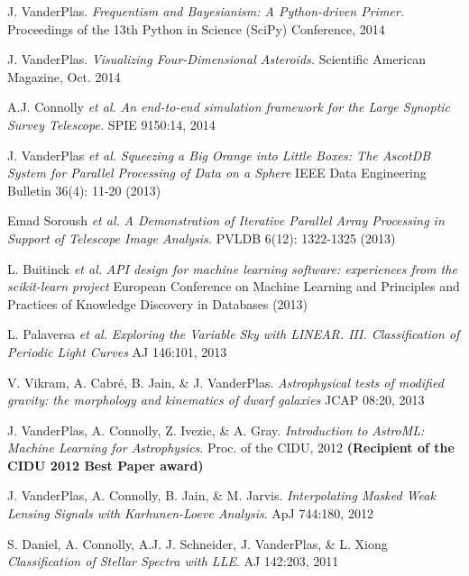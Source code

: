 \documentclass{article} %
\def\bf{\bfseries}
\def\sl{\slshape}
\begin{document}
{\begin{itemize}[leftmargin=0ex, itemsep=0ex, parsep=.5ex, labelindent=-4ex]
    \publication
      J. VanderPlas.
      {\it Frequentism and Bayesianism: A Python-driven Primer.}
      Proceedings of the 13th Python in Science (SciPy) Conference, 2014

    \publication
      J. VanderPlas.
      {\it Visualizing Four-Dimensional Asteroids.}
      Scientific American Magazine, Oct. 2014

    \publication
      A.J. Connolly {\it et al.}
      {\it An end-to-end simulation framework for the Large Synoptic Survey Telescope.}
      SPIE 9150:14, 2014

    \publication
      J. VanderPlas {\it et al.}
      {\it Squeezing a Big Orange into Little Boxes: The AscotDB System
        for Parallel Processing of Data on a Sphere}
      IEEE Data Engineering Bulletin 36(4): 11-20 (2013)

    \publication
      Emad Soroush {\it et al.}
      {\it A Demonstration of Iterative Parallel Array Processing in Support
        of Telescope Image Analysis.}
      PVLDB 6(12): 1322-1325 (2013)

    \publication
      L. Buitinck {\it et al.}
      {\it API design for machine learning software:
        experiences from the scikit-learn project}
      European Conference on Machine Learning and Principles and Practices
      of Knowledge Discovery in Databases (2013)

    \publication
      L. Palaversa {\sl et al.}
      {\sl Exploring the Variable Sky with LINEAR. III.
        Classification of Periodic Light Curves}
      AJ 146:101, 2013

    \publication
      V. Vikram, A. Cabr\'{e}, B. Jain, \& J. VanderPlas.
      {\it Astrophysical tests of modified gravity:
        the morphology and kinematics of dwarf galaxies}
      JCAP 08:20, 2013
      
    \publication
      J. VanderPlas, A. Connolly, Z. Ivezic, \& A. Gray.
      {\sl Introduction to AstroML: Machine Learning for Astrophysics}.
      Proc. of the CIDU, 2012
      {\bf (Recipient of the CIDU 2012 Best Paper award)}

    \publication
      J. VanderPlas, A. Connolly, B. Jain, \& M. Jarvis.
      {\it Interpolating Masked Weak Lensing Signals with Karhunen-Loeve
        Analysis}.
      ApJ 744:180, 2012

    \publication
      S. Daniel, A. Connolly, A.J. J. Schneider, J. VanderPlas, \& L. Xiong
      {\sl Classification of Stellar Spectra with LLE}.
      AJ 142:203, 2011


\end{itemize}}
\end{document}
